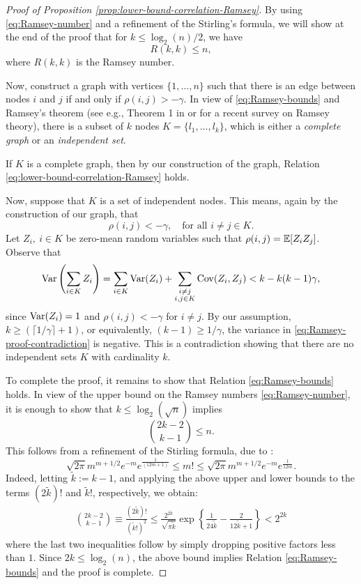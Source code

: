 \begin{proof}[Proof of Proposition \ref{prop:lower-bound-correlation-Ramsey}]
By using \eqref{eq:Ramsey-number} and a refinement of the Stirling's formula, 
we will show at the end of the proof that for $k \le \log_2({n})/2$, we have 
\begin{equation}\label{eq:Ramsey-bounds}
 R(k,k) \le n,
\end{equation}
where $R(k,k)$ is the Ramsey number.  

Now, construct a graph with vertices $\{1,\dots,n\}$ such that there is an edge between nodes $i$ and $j$ if and only if $\rho(i,j) > -\gamma$. 
In view of \eqref{eq:Ramsey-bounds} and Ramsey's theorem (see e.g., Theorem 1 in \cite{fox2009lecture} or \cite{conlon2015recent} for a recent survey on Ramsey theory), there is a subset of $k$ nodes $K =\{l_1,\dots,l_k\}$, which is either a {\em complete graph} or an {\em independent set}.

If $K$ is a complete graph, then by our construction of the graph, Relation \eqref{eq:lower-bound-correlation-Ramsey} holds. 

Now, suppose that $K$ is a set of independent nodes.  This means, again by the construction of our graph, that
$$
\rho(i,j) < -\gamma,\quad\mbox{for all }i\not= j\in K.
$$
Let $Z_i,\ i \in K$ be zero-mean random variables such that 
$\rho(i,j) = {\mathbb E} [Z_iZ_j]$. Observe that
\begin{equation} \label{eq:Ramsey-proof-contradiction}
    {\rm {Var}}\left( \sum_{i\in K} Z_i\right) 
    = \sum_{i\in K} {\rm {Var}}(Z_i) + \sum_{\substack{i\not=j\\i,j \in K}} {\rm {Cov}}(Z_i, Z_j) 
    <  k - k(k-1)\gamma,
\end{equation}
since ${\rm {Var}}(Z_i)=1$ and $\rho(i,j)<-\gamma$ for $i\neq j$.
By our assumption, $k\ge \left(\lceil 1/\gamma \rceil + 1\right)$, or equivalently, $(k-1) \ge 1/\gamma$, the variance in \eqref{eq:Ramsey-proof-contradiction} is negative. 
This is a contradiction showing that there are no independent sets $K$ with cardinality $k$.

To complete the proof, it remains to show that Relation \eqref{eq:Ramsey-bounds} holds.
In view of the upper bound on the Ramsey numbers \eqref{eq:Ramsey-number}, it 
is enough to show that $k \le \log_2(\sqrt{n})$ implies
$$
\binom{2k-2}{k-1} \le n.
$$
This follows from a refinement of the Stirling formula, due to \citet{robbins1955remark}:
$$
 \sqrt{2\pi} m^{m+1/2} e^{-m} e^{\frac{1}{(12 m +1)}} \le  m! \le \sqrt{2\pi} m^{m+1/2} e^{-m} 
 e^{\frac{1}{12 m}}.
$$
Indeed, letting $\widetilde k:= k-1$, and applying the above upper and lower bounds 
to the  terms $(2\widetilde k)!$ and $\widetilde k!$, respectively, we obtain:
\begin{align*}
\binom{2k-2}{k-1} \equiv \frac{(2\widetilde k)!}{ (\widetilde k!)^2 }
\le \frac{2^{2\widetilde k}}{\sqrt{\pi \widetilde k}}\exp\left \{ \frac{1}{24 \widetilde k} -
\frac{2}{ 12 \widetilde k +1}\right\} < 2^{2 k}
\end{align*}
where the last two inequalities follow by simply dropping positive factors less than $1$.
Since $2k \le \log_2(n)$, the above bound implies Relation \eqref{eq:Ramsey-bounds} 
and the proof is complete.
\end{proof}

